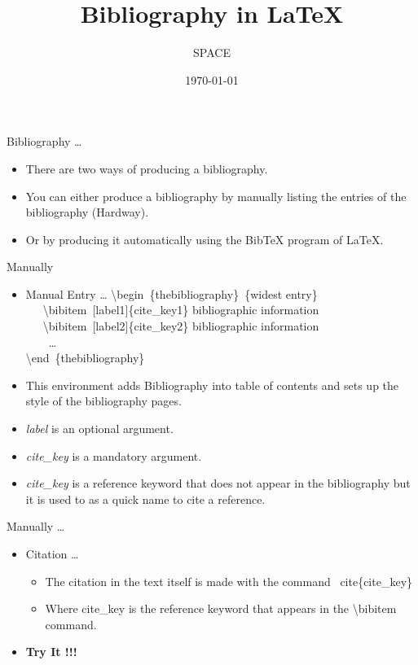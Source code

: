 \documentclass{beamer}
\title{Bibliography in \LaTeX}
\author{SPACE}
\date{\today}
\begin{document}
\maketitle
\begin{frame}{Bibliography \ldots}
\begin{itemize}
\pause \item[] There are two ways of producing a bibliography.
\pause \item You can either produce a bibliography by manually listing the entries of the bibliography (Hardway).
\pause \item Or by producing it automatically using the BibTeX program of LaTeX.
\end{itemize}
\end{frame}
\begin{frame}{Manually}
\begin{itemize}
\pause \item[] \begin{block}{Manual Entry \ldots}
\textbackslash begin~\{thebibliography\}~\{widest entry\}\\
~~~\textbackslash bibitem~[label1]\{cite\_key1\} bibliographic information\\
~~~\textbackslash bibitem~[label2]\{cite\_key2\} bibliographic information \\
~~~~\ldots\\
\textbackslash end~\{thebibliography\}
\end{block}
\pause\item This environment adds Bibliography into table of contents and sets up the style of the bibliography pages.
\pause\item \emph{label} is an optional argument.
\pause\item \emph{cite\_key} is a mandatory argument.
\pause\item  \emph{cite\_key} is a reference keyword that does not appear in the bibliography but it is used to as a quick name to cite a reference.
\end{itemize}
\end{frame}
\begin{frame}{Manually \ldots}
\begin{itemize}
\pause \item[] \begin{block}{Citation \ldots}
\begin{itemize}
\pause \item The citation in the text itself is made with the command \ cite\{cite\_key\}
\pause \item Where cite\_key is the reference keyword that appears in the \textbackslash bibitem command. 
\end{itemize}
\end{block}
\vspace{1.5cm}
\pause \item[] \large \textbf{Try It !!!}
\end{itemize}
\end{frame}
\end{document}
